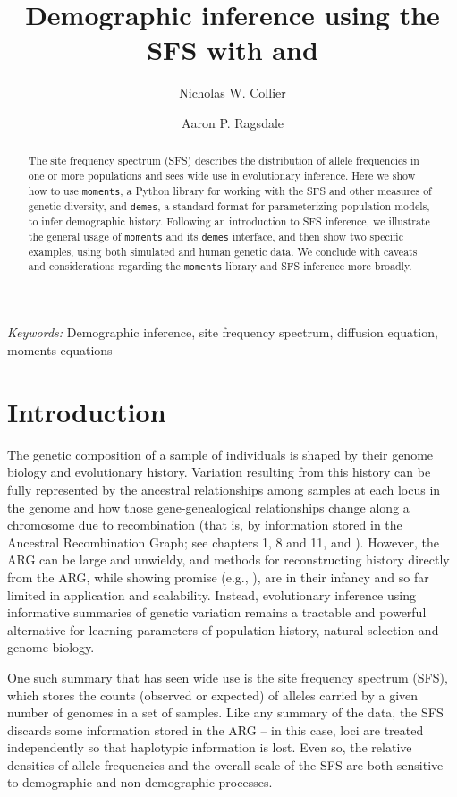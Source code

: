 \documentclass[]{article}
\title{Demographic inference using the SFS with \moments and \demes}
\author[1]{Nicholas W. Collier}
\author[1,*]{Aaron P. Ragsdale}
\affil[1]{Department of Integrative Biology, University of Wisconsin--Madison}
\affil[*]{apragsdale@wisc.edu}
\affil[ ]{ORCID IDs: 0009-0005-0385-9798 (NWC), 0000-0003-0715-3432 (APR)}
\newcommand{\moments}{\texttt{moments}\xspace}
\newcommand{\demes}{\texttt{demes}\xspace}
\begin{document}
\linenumbers
\doublespacing

\maketitle

\begin{abstract}

    The site frequency spectrum (SFS) describes the distribution of allele
    frequencies in one or more populations and sees wide use in evolutionary
    inference. Here we show how to use \moments, a Python library for working
    with the SFS and other measures of genetic diversity, and \demes, a
    standard format for parameterizing population models, to infer demographic
    history. Following an introduction to SFS inference, we illustrate the
    general usage of \moments and its \demes interface, and then show two
    specific examples, using both simulated and human genetic data. We conclude
    with caveats and considerations regarding the \moments library and SFS
    inference more broadly.

\end{abstract}

\emph{Keywords:} Demographic inference, site frequency spectrum, diffusion
equation, moments equations

\section*{Introduction}

The genetic composition of a sample of individuals is shaped by their genome
biology and evolutionary history. Variation resulting from this history can be
fully represented by the ancestral relationships among samples at each locus in
the genome and how those gene-genealogical relationships change along a
chromosome due to recombination (that is, by information stored in the
Ancestral Recombination Graph; see chapters 1, 8 and 11, and
\cite{nielsen2025inference}). However, the ARG can be large and unwieldy, and
methods for reconstructing history directly from the ARG, while showing promise
(e.g., \cite{yc2022evaluation, fan2023likelihood, brandt2024promise}), are in
their infancy and so far limited in application and scalability. Instead,
evolutionary inference using informative summaries of genetic variation remains
a tractable and powerful alternative for learning parameters of population
history, natural selection and genome biology.

One such summary that has seen wide use is the site frequency spectrum (SFS),
which stores the counts (observed or expected) of alleles carried by a given
number of genomes in a set of samples. Like any summary of the data, the SFS
discards some information stored in the ARG -- in this case, loci are treated
independently so that haplotypic information is lost. Even so, the relative
densities of allele frequencies and the overall scale of the SFS are both
sensitive to demographic and non-demographic processes.
\end{document}

